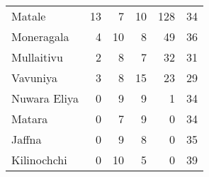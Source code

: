 \begin{tabular}{lrrrrr}
Matale       &          13 &           7 &           10 &              128 &          34 \\
Moneragala   &           4 &          10 &            8 &               49 &          36 \\
Mullaitivu   &           2 &           8 &            7 &               32 &          31 \\
Vavuniya     &           3 &           8 &           15 &               23 &          29 \\
Nuwara Eliya &           0 &           9 &            9 &                1 &          34 \\
Matara       &           0 &           7 &            9 &                0 &          34 \\
Jaffna       &           0 &           9 &            8 &                0 &          35 \\
Kilinochchi  &           0 &          10 &            5 &                0 &          39 \\
\bottomrule
\end{tabular}
